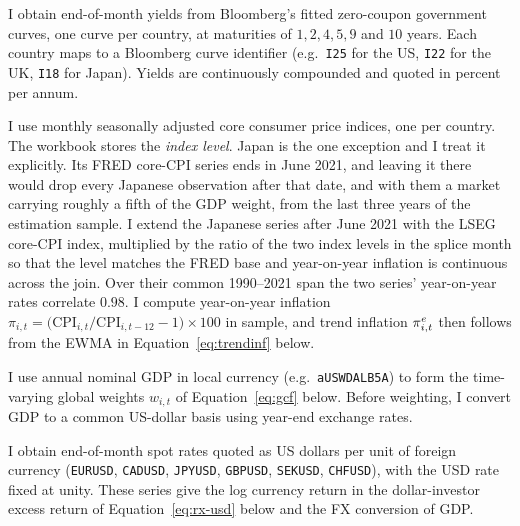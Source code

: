 \begin{description}[leftmargin=1.5em, style=nextline]
  \item[Zero-coupon yields (Bloomberg).] I obtain end-of-month yields from
    Bloomberg's fitted zero-coupon government curves,
    one curve per country, at maturities of $1,2,4,5,9$ and $10$ years. Each
    country maps to a Bloomberg curve identifier (e.g.\ \texttt{I25} for the US,
    \texttt{I22} for the UK, \texttt{I18} for Japan). Yields are continuously
    compounded and quoted in percent per annum.
  \item[Core CPI (FRED).] I use monthly seasonally adjusted core
    consumer price indices, one per country. The workbook stores the \emph{index level}.
    Japan is the one exception and I treat it explicitly. Its FRED core-CPI series
    ends in June 2021, and leaving it there would drop every Japanese observation
    after that date, and with them a market carrying roughly a fifth of the GDP
    weight, from the last three years of the estimation sample. I extend the Japanese series after
    June 2021 with the LSEG core-CPI index, multiplied by the ratio of the two index
    levels in the splice month so that the level matches the FRED base and
    year-on-year inflation is continuous across the join. Over their common
    1990--2021 span the two series' year-on-year rates correlate $0.98$. I compute year-on-year
    inflation
    $\pi_{i,t}=\big(\mathrm{CPI}_{i,t}/\mathrm{CPI}_{i,t-12}-1\big)\times 100$
    in sample, and trend inflation $\pi^{e}_{i,t}$ then follows from the EWMA
    in Equation~\eqref{eq:trendinf} below.
  \item[Nominal GDP (LSEG Refinitiv).] I use annual nominal GDP in local
    currency (e.g.\ \texttt{aUSWDALB5A}) to form the time-varying global weights
    $w_{i,t}$ of Equation~\eqref{eq:gcf} below. Before weighting, I convert GDP to a common
    US-dollar basis using year-end exchange rates.
  \item[Spot exchange rates (Bloomberg).] I obtain end-of-month spot rates
    quoted as US dollars per unit of foreign currency (\texttt{EURUSD},
    \texttt{CADUSD}, \texttt{JPYUSD}, \texttt{GBPUSD}, \texttt{SEKUSD},
    \texttt{CHFUSD}), with the USD rate fixed at unity. These series give the
    log currency return in the dollar-investor excess
    return of Equation~\eqref{eq:rx-usd} below and the FX conversion of GDP.
\end{description}


